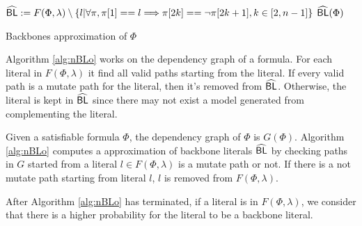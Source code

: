 \begin{algorithm}
\SetAlgoShortEnd
\SetFillComment
{}

${\sf \widehat{BL}}:=F(\Phi, \lambda)\setminus\{l | \forall \pi, \pi[1]==l\Longrightarrow\pi[2k]==\neg\pi[2k+1], k\in[2,n-1]\}$\;
\Return ${\sf \widehat{BL}}(\Phi)$\;
\caption{Backbones approximation of $\Phi$}
\label{alg:nBLo}
\end{algorithm}

Algorithm \ref{alg:nBLo} works on the dependency graph of a formula. For each literal in $F(\Phi, \lambda)$ it find all valid paths starting from the literal. If every valid path is a mutate path for the literal, then it's removed from ${\sf \widehat{BL}}$. Otherwise, the literal is kept in ${\sf \widehat{BL}}$ since there may not exist a model generated from complementing the literal.

Given a satisfiable formula $\Phi$, the dependency graph of $\Phi$ is $G(\Phi)$. Algorithm \ref{alg:nBLo} computes a approximation of backbone literals ${\sf \widehat{BL}}$ by checking paths in $G$ started from a literal $l\in F(\Phi, \lambda)$ is a mutate path or not. If there is a not mutate path starting from literal $l$, $l$ is removed from $F(\Phi, \lambda)$.

After Algorithm \ref{alg:nBLo} has terminated, if a literal is in $F(\Phi, \lambda)$, we consider that there is a higher probability for the literal to be a backbone literal.
